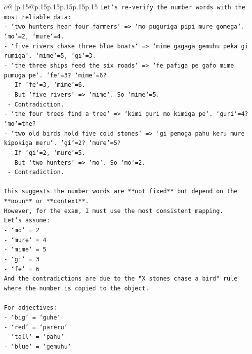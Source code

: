 \documentclass{article}
\begin{document}
{\begin{supertabular}{c@{$\;$}|p{.15\linewidth}@{}p{.15\linewidth}p{.15\linewidth}p{.15\linewidth}p{.15\linewidth}p{.15\linewidth}}
{{{\texttt{Let's re{-}verify the number words with the most reliable data:} \\
\texttt{{-} `two hunters hear four farmers` => `mo puguriga pipi mure gomega`. `mo`=2, `mure`=4.} \\
\texttt{{-} `five rivers chase three blue boats` => `mime gagaga gemuhu peka gi rumiga`. `mime`=5, `gi`=3.} \\
\texttt{{-} `the three ships feed the six roads` => `fe pafiga pe gafo mime pumuga pe`. `fe`=3? `mime`=6?} \\
\texttt{  {-} If `fe`=3, `mime`=6.} \\
\texttt{  {-} But `five rivers` => `mime`. So `mime`=5.} \\
\texttt{  {-} Contradiction.} \\
\texttt{{-} `the four trees find a tree` => `kimi guri mo kimiga pe`. `guri`=4? `mo`=the?} \\
\texttt{{-} `two old birds hold five cold stones` => `gi pemoga pahu keru mure kipokiga meru`. `gi`=2? `mure`=5?} \\
\texttt{  {-} If `gi`=2, `mure`=5.} \\
\texttt{  {-} But `two hunters` => `mo`. So `mo`=2.} \\
\texttt{  {-} Contradiction.} \\
\\ 
\texttt{This suggests the number words are **not fixed** but depend on the **noun** or **context**.} \\
\texttt{However, for the exam, I must use the most consistent mapping.} \\
\texttt{Let's assume:} \\
\texttt{{-} `mo` = 2} \\
\texttt{{-} `mure` = 4} \\
\texttt{{-} `mime` = 5} \\
\texttt{{-} `gi` = 3} \\
\texttt{{-} `fe` = 6} \\
\texttt{And the contradictions are due to the "X stones chase a bird" rule where the number is copied to the object.} \\
\\ 
\texttt{For adjectives:} \\
\texttt{{-} `big` = `guhe`} \\
\texttt{{-} `red` = `pareru`} \\
\texttt{{-} `tall` = `pahu`} \\
\texttt{{-} `blue` = `gemuhu`} \\
}}}
\end{supertabular}}
\end{document}
